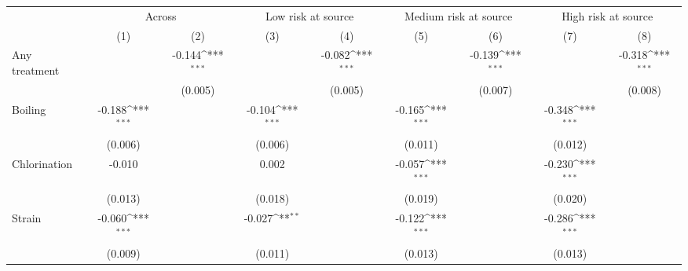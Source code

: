 {
\def\sym#1{\ifmmode^{#1}\else\(^{#1}\)\fi}
\begin{tabular}{l*{8}{c}}
\hline\hline
                    &\multicolumn{2}{c}{Across}                 &\multicolumn{2}{c}{Low risk at source}     &\multicolumn{2}{c}{Medium risk at source}  &\multicolumn{2}{c}{High risk at source}    \\\cmidrule(lr){2-3}\cmidrule(lr){4-5}\cmidrule(lr){6-7}\cmidrule(lr){8-9}
                    &\multicolumn{1}{c}{(1)}         &\multicolumn{1}{c}{(2)}         &\multicolumn{1}{c}{(3)}         &\multicolumn{1}{c}{(4)}         &\multicolumn{1}{c}{(5)}         &\multicolumn{1}{c}{(6)}         &\multicolumn{1}{c}{(7)}         &\multicolumn{1}{c}{(8)}         \\
\hline
Any treatment &                     &      -0.144\sym{***}&                     &      -0.082\sym{***}&                     &      -0.139\sym{***}&                     &      -0.318\sym{***}\\
                    &                     &     (0.005)         &                     &     (0.005)         &                     &     (0.007)         &                     &     (0.008)         \\
Boiling             &      -0.188\sym{***}&                     &      -0.104\sym{***}&                     &      -0.165\sym{***}&                     &      -0.348\sym{***}&                     \\
                    &     (0.006)         &                     &     (0.006)         &                     &     (0.011)         &                     &     (0.012)         &                     \\
Chlorination        &      -0.010         &                     &       0.002         &                     &      -0.057\sym{***}&                     &      -0.230\sym{***}&                     \\
                    &     (0.013)         &                     &     (0.018)         &                     &     (0.019)         &                     &     (0.020)         &                     \\
Strain              &      -0.060\sym{***}&                     &      -0.027\sym{**} &                     &      -0.122\sym{***}&                     &      -0.286\sym{***}&                     \\
                    &     (0.009)         &                     &     (0.011)         &                     &     (0.013)         &                     &     (0.013)         &                     \\

\end{tabular}}
